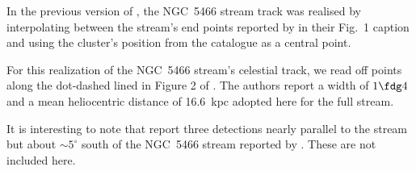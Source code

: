 In the previous version of \galstreams, the NGC~5466 stream track was realised by interpolating between the stream's end points
reported by \citet{Grillmair2006_5466} in their  Fig.~1 caption and using the cluster's position from the
\citet[][2010 edition]{Harris1996} catalogue as a central point.

For this realization of the NGC~5466 stream's celestial track, we read off points along the dot-dashed lined in Figure 2 of \citet{Grillmair2006_5466}. The authors report a width of $1\fdg4$ and a mean heliocentric distance of 16.6~kpc adopted here for the full stream.

It is interesting to note that \citet{Weiss2018} report three detections nearly parallel to the stream but about $\sim 5^\circ$ south of the NGC~5466 stream reported by \citet{Grillmair2006_5466}. These are not included here.
